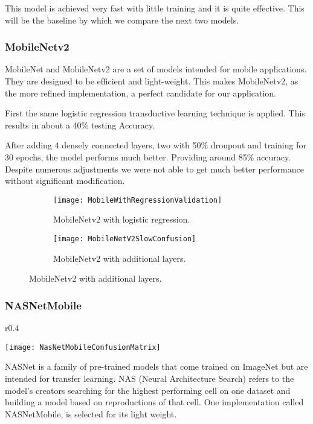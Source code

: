 \documentclass[]{article}
\begin{document}
This model is achieved very fast with little training and it is quite effective.
This will be the baseline by which we compare the next two models.

\subsubsection{MobileNetv2}

MobileNet\cite{Howard2017} and MobileNetv2\cite{Sandler2019} 
are a set of models intended for mobile applications.
They are designed to be efficient and light-weight.
This makes MobileNetv2, as the more refined implementation,
a perfect candidate for our application.  

First the same logistic regression transductive learning technique is applied.
This results in about a 40\% testing Accuracy.

After adding 4 densely connected layers, two with 50\% droupout and training for 30 epochs, the model performs much better. Providing around 85\% accuracy. Despite numerous adjustments we were not able to get much better performance without significant modification.

\begin{figure}[H]
	\centering
	\begin{subfigure}[b]{0.49\textwidth}
		\texttt{[image: MobileWithRegressionValidation]}
		\caption{MobileNetv2 with logistic regression.}	
	\end{subfigure}
	\hfill
	\begin{subfigure}[b]{0.49\textwidth}
		\texttt{[image: MobileNetV2SlowConfusion]}
		\caption{MobileNetv2 with additional layers.}	
	\end{subfigure}
\end{figure}

\subsubsection{NASNetMobile}

\begin{wrapfigure}{r}{0.4\textwidth}
	\begin{center}
		\texttt{[image: NasNetMobileConfusionMatrix]}
	\end{center}
	\caption{NASNetMobile with additional layers.}	
\end{wrapfigure}

NASNet is a family of pre-trained models that come trained on ImageNet but are intended for transfer learning.
NAS (Neural Architecture Search) refers to the model's creators searching for the highest performing cell on one dataset and building a model based on reproductions of that cell\cite{Zoph2018}. 
One implementation called NASNetMobile, is selected for its light weight.
\end{document}
